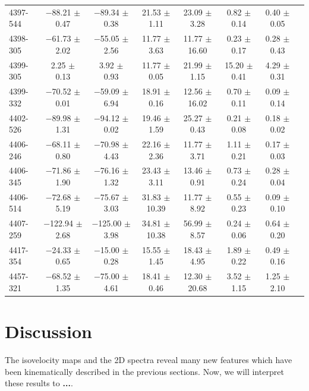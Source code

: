 \documentclass[a4paper,fleqn,usenatbib]{mnras}     %
\begin{document}
\begin{longtable}{l c c c c c c c }
4397-544   &   $-$88.21 $\pm$ 0.47   &   $-$89.34 $\pm$ 0.38   &    21.53 $\pm$ 1.11   &  23.09 $\pm$ 3.28   &   0.82 $\pm$ 0.14   &   0.40 $\pm$ 0.05  \\
4398-305   &   $-$61.73 $\pm$ 2.02   &   $-$55.05 $\pm$ 2.56   &    11.77 $\pm$ 3.63   &  11.77 $\pm$16.60   &   0.23 $\pm$ 0.17   &   0.28 $\pm$ 0.43  \\
4399-305   &     2.25 $\pm$ 0.13   &     3.92 $\pm$ 0.93   &    11.77 $\pm$ 0.05   &  21.99 $\pm$ 1.15   &  15.20 $\pm$ 0.41   &   4.29 $\pm$ 0.31  \\
4399-332   &   $-$70.52 $\pm$ 0.01   &   $-$59.09 $\pm$ 6.94   &    18.91 $\pm$ 0.16   &  12.56 $\pm$16.02   &   0.70 $\pm$ 0.11   &   0.09 $\pm$ 0.14  \\
4402-526   &   $-$89.98 $\pm$ 1.31   &   $-$94.12 $\pm$ 0.02   &    19.46 $\pm$ 1.59   &  25.27 $\pm$ 0.43   &   0.21 $\pm$ 0.08   &   0.18 $\pm$ 0.02  \\
4406-246   &   $-$68.11 $\pm$ 0.80   &   $-$70.98 $\pm$ 4.43   &    22.16 $\pm$ 2.36   &  11.77 $\pm$ 3.71   &   1.11 $\pm$ 0.21   &   0.17 $\pm$ 0.03  \\
4406-345   &   $-$71.86 $\pm$ 1.90   &   $-$76.16 $\pm$ 1.32   &    23.43 $\pm$ 3.11   &  13.46 $\pm$ 0.91   &   0.73 $\pm$ 0.24   &   0.28 $\pm$ 0.04  \\
4406-514   &   $-$72.68 $\pm$ 5.19   &   $-$75.67 $\pm$ 3.03   &    31.83 $\pm$10.39   &  11.77 $\pm$ 8.92   &   0.55 $\pm$ 0.23   &   0.09 $\pm$ 0.10  \\
4407-259   &  $-$122.94 $\pm$ 2.68   &  $-$125.00 $\pm$ 3.98   &    34.81 $\pm$10.38   &  56.99 $\pm$ 8.57   &   0.24 $\pm$ 0.06   &   0.64 $\pm$ 0.20  \\
4417-354   &   $-$24.33 $\pm$ 0.65   &   $-$15.00 $\pm$ 0.28   &    15.55 $\pm$ 1.45   &  18.43 $\pm$ 4.95   &   1.89 $\pm$ 0.22   &   0.49 $\pm$ 0.16  \\
4457-321   &   $-$68.52 $\pm$ 1.35   &   $-$75.00 $\pm$ 4.61   &    18.41 $\pm$ 0.46   &  12.30 $\pm$20.68   &   3.52 $\pm$ 1.15   &   1.25 $\pm$ 2.10  \\
\hline	
\end{longtable}
\twocolumn





\section{Discussion}\label{sec:discussion}
The isovelocity maps and the 2D spectra reveal many new features which have been kinematically described in the previous sections. 
Now, we will interpret these results to \textbf{...}.
\end{document}
